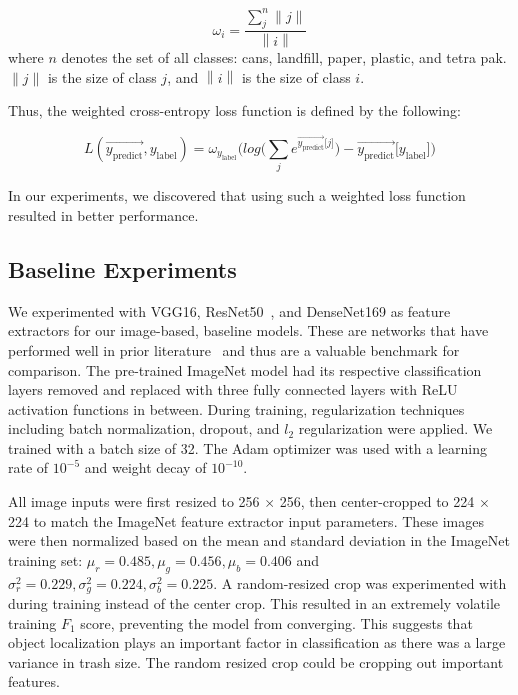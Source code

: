 \documentclass[conference]{ieeeconf}
\newcommand{\norm}[1]{\left\lVert#1\right\rVert}
\newcommand{\ora}[1]{\overrightarrow{#1}}
\begin{document}
\begin{equation*}
    \omega_i = \frac{\sum_{j}^{n}{\norm{j}}}{\norm{i}}
\end{equation*}
where $n$ denotes the set of all classes: cans, landfill, paper, plastic, and tetra pak. $\norm{j}$ is the size of class $j$, and $\norm{i}$ is the size of class $i$. 

Thus, the weighted cross-entropy loss function is defined by the following:

\begin{equation*}
    L(\ora{y_\text{predict}}, y_\text{label}) = \omega_{y_\text{label}}\Bigg(log\bigg({\sum_{j} {e^{\ora{y_\text{predict}} \lbrack j \rbrack}}}\bigg)-\ora{y_\text{predict}} \lbrack y_\text{label} \rbrack\Bigg)
\end{equation*}

In our experiments, we discovered that using such a weighted loss function resulted in better performance.

\subsection{Baseline Experiments}

We experimented with VGG16, ResNet50~\cite{ResNet}, and DenseNet169 as feature extractors for our image-based, baseline models. These are networks that have performed well in prior literature~\cite{White2020, Aral2019, Vo2019, Yang2020} and thus are a valuable benchmark for comparison. The pre-trained ImageNet model had its respective classification layers removed and replaced with three fully connected layers with ReLU activation functions in between. During training, regularization techniques including batch normalization, dropout, and $l_2$ regularization were applied. We trained with a batch size of 32. The Adam optimizer was used with a learning rate of $10^{-5}$ and weight decay of $10^{-10}$. 

All image inputs were first resized to 256 $\times$ 256, then center-cropped to 224 $\times$ 224 to match the ImageNet feature extractor input parameters. These images were then normalized based on the mean and standard deviation in the ImageNet training set: $\mu_r=0.485, \mu_g=0.456, \mu_b=0.406$ and $\sigma^2_r=0.229, \sigma^2_g=0.224, \sigma^2_b=0.225$. A random-resized crop was experimented with during training instead of the center crop. This resulted in an extremely volatile training $F_1$ score, preventing the model from converging. This suggests that object localization plays an important factor in classification as there was a large variance in trash size. The random resized crop could be cropping out important features. 
\end{document}
